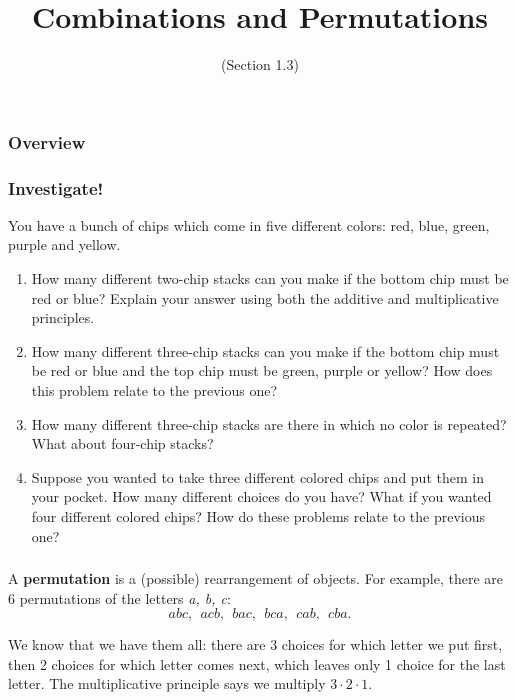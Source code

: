 \documentclass[11pt, compress]{beamer}
\title{Combinations and Permutations}
\subtitle{(Section 1.3)}
\author{}
\date[]{}
\newcommand{\terminology}[1]{\textbf{#1}}
\begin{document}
\begin{frame}
\maketitle 
\end{frame}
 
\begin{frame}
\frametitle{Overview}
\tableofcontents 
\end{frame}
 
\begin{frame}
\frametitle{Investigate!}
 You have a bunch of chips which come in five different colors: red, blue, green, purple and yellow.\begin{enumerate}
\item{} How many different two-chip stacks can you make if the bottom chip must be red or blue? Explain your answer using both the additive and multiplicative principles.


\item{} How many different three-chip stacks can you make if the bottom chip must be red or blue and the top chip must be green, purple or yellow? How does this problem relate to the previous one?


\item{} How many different three-chip stacks are there in which no color is repeated? What about four-chip stacks?


\item{} Suppose you wanted to take three different colored chips and put them in your pocket. How many different choices do you have? What if you wanted four different colored chips? How do these problems relate to the previous one?

\end{enumerate}

\end{frame}
 
\begin{frame}
\frametitle{}
A \terminology{permutation} is a (possible) rearrangement of objects. For example, there are 6 permutations of the letters \emph{a, b, c}:%
\begin{equation*}
abc, ~~ acb, ~~ bac, ~~bca, ~~ cab, ~~ cba\text{.}
\end{equation*}

 
\pause \vfill 

We know that we have them all: there are 3 choices for which letter we put first, then 2 choices for which letter comes next, which leaves only 1 choice for the last letter. The multiplicative principle says we multiply \(3\cdot 2 \cdot 1\).
\end{frame}
 
\end{document}
